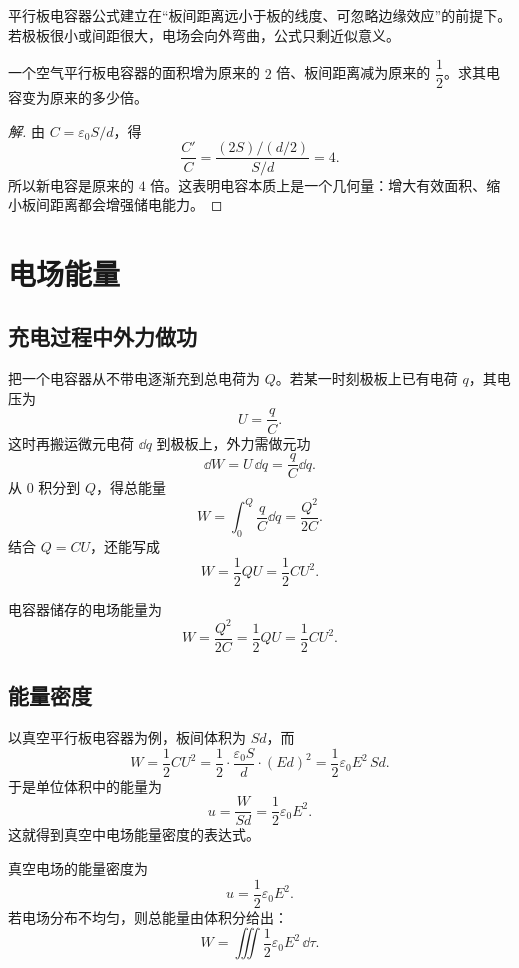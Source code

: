 \begin{remark}
平行板电容器公式建立在“板间距离远小于板的线度、可忽略边缘效应”的前提下。若极板很小或间距很大，电场会向外弯曲，公式只剩近似意义。
\end{remark}

\begin{example}
一个空气平行板电容器的面积增为原来的 $2$ 倍、板间距离减为原来的 $\dfrac{1}{2}$。求其电容变为原来的多少倍。
\end{example}

\begin{proof}[解]
由 $C=\varepsilon_0 S/d$，得
\[
\frac{C'}{C}=\frac{(2S)/(d/2)}{S/d}=4.
\]
所以新电容是原来的 $4$ 倍。这表明电容本质上是一个几何量：增大有效面积、缩小板间距离都会增强储电能力。
\end{proof}

\section{电场能量}

\subsection{充电过程中外力做功}

把一个电容器从不带电逐渐充到总电荷为 $Q$。若某一时刻极板上已有电荷 $q$，其电压为
\[
U=\frac{q}{C}.
\]
这时再搬运微元电荷 $\dd q$ 到极板上，外力需做元功
\[
\dd W=U\,\dd q=\frac{q}{C}\dd q.
\]
从 $0$ 积分到 $Q$，得总能量
\[
W=\int_0^Q \frac{q}{C}\dd q=\frac{Q^2}{2C}.
\]
结合 $Q=CU$，还能写成
\[
W=\frac{1}{2}QU=\frac{1}{2}CU^2.
\]

\begin{law}
电容器储存的电场能量为
\[
W=\frac{Q^2}{2C}=\frac{1}{2}QU=\frac{1}{2}CU^2.
\]
\end{law}

\subsection{能量密度}

以真空平行板电容器为例，板间体积为 $Sd$，而
\[
W=\frac{1}{2}CU^2=\frac{1}{2}\cdot \frac{\varepsilon_0 S}{d}\cdot (Ed)^2
=\frac{1}{2}\varepsilon_0 E^2\,Sd.
\]
于是单位体积中的能量为
\[
u=\frac{W}{Sd}=\frac{1}{2}\varepsilon_0 E^2.
\]
这就得到真空中电场能量密度的表达式。

\begin{law}
真空电场的能量密度为
\[
u=\frac{1}{2}\varepsilon_0 E^2.
\]
若电场分布不均匀，则总能量由体积分给出：
\[
W=\iiint \frac{1}{2}\varepsilon_0 E^2\,\dd \tau.
\]
\end{law}

